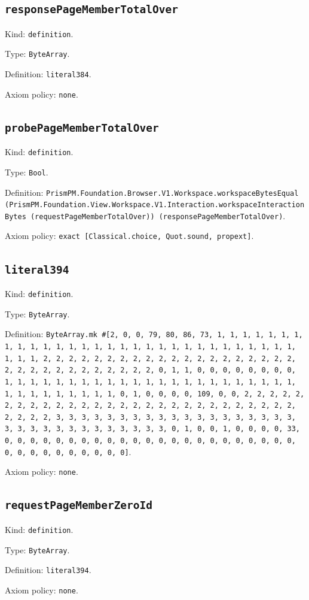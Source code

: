 \documentclass[11pt]{article}
\begin{document}
\subsection*{\texttt{responsePageMemberTotalOver}}
\noindent Kind: \texttt{definition}.\par
\noindent Type: \texttt{ByteArray}.\par
\noindent Definition: \texttt{literal384}.\par
\noindent Axiom policy: \texttt{none}.\par
\subsection*{\texttt{probePageMemberTotalOver}}
\noindent Kind: \texttt{definition}.\par
\noindent Type: \texttt{Bool}.\par
\noindent Definition: \texttt{PrismPM.Foundation.Browser.V1.Workspace.workspaceBytesEqual (PrismPM.Foundation.View.Workspace.V1.Interaction.workspaceInteractionBytes (requestPageMemberTotalOver)) (responsePageMemberTotalOver)}.\par
\noindent Axiom policy: \texttt{exact [Classical.choice, Quot.sound, propext]}.\par
\subsection*{\texttt{literal394}}
\noindent Kind: \texttt{definition}.\par
\noindent Type: \texttt{ByteArray}.\par
\noindent Definition: \texttt{ByteArray.mk \#[2, 0, 0, 79, 80, 86, 73, 1, 1, 1, 1, 1, 1, 1, 1, 1, 1, 1, 1, 1, 1, 1, 1, 1, 1, 1, 1, 1, 1, 1, 1, 1, 1, 1, 1, 1, 1, 1, 1, 1, 2, 2, 2, 2, 2, 2, 2, 2, 2, 2, 2, 2, 2, 2, 2, 2, 2, 2, 2, 2, 2, 2, 2, 2, 2, 2, 2, 2, 2, 2, 2, 2, 0, 1, 1, 0, 0, 0, 0, 0, 0, 0, 0, 1, 1, 1, 1, 1, 1, 1, 1, 1, 1, 1, 1, 1, 1, 1, 1, 1, 1, 1, 1, 1, 1, 1, 1, 1, 1, 1, 1, 1, 1, 1, 1, 0, 1, 0, 0, 0, 0, 109, 0, 0, 2, 2, 2, 2, 2, 2, 2, 2, 2, 2, 2, 2, 2, 2, 2, 2, 2, 2, 2, 2, 2, 2, 2, 2, 2, 2, 2, 2, 2, 2, 2, 2, 3, 3, 3, 3, 3, 3, 3, 3, 3, 3, 3, 3, 3, 3, 3, 3, 3, 3, 3, 3, 3, 3, 3, 3, 3, 3, 3, 3, 3, 3, 3, 3, 0, 1, 0, 0, 1, 0, 0, 0, 0, 33, 0, 0, 0, 0, 0, 0, 0, 0, 0, 0, 0, 0, 0, 0, 0, 0, 0, 0, 0, 0, 0, 0, 0, 0, 0, 0, 0, 0, 0, 0, 0, 0, 0]}.\par
\noindent Axiom policy: \texttt{none}.\par
\subsection*{\texttt{requestPageMemberZeroId}}
\noindent Kind: \texttt{definition}.\par
\noindent Type: \texttt{ByteArray}.\par
\noindent Definition: \texttt{literal394}.\par
\noindent Axiom policy: \texttt{none}.\par
\end{document}
